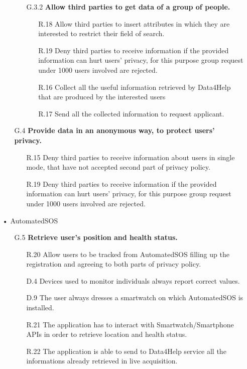 \begin{enumerate}
\begin{enumerate}
\begin{enumerate}
    	\item [G.3.2] \textbf{Allow third parties to get data of a group of people.}
		\begin{enumerate}
    	\item [R.18] Allow third parties to insert attributes in which they are interested to restrict their field of search.
    	\item [R.19] Deny third parties to receive information if the provided information can hurt users' privacy, for this purpose group request under 1000 users involved are rejected.
    	\item [R.16] Collect all the useful information retrieved by Data4Help that are produced by the interested users 
    	\item [R.17] Send all the collected information to request applicant.
    	\end{enumerate}
    	\end{enumerate}
    	
    \item [G.4] \textbf{Provide data in an anonymous way, to protect users' privacy.}
		\begin{enumerate}
    	\item [R.15] Deny third parties to receive information about users in  single mode, that have not accepted second part of privacy policy.
    	\item [R.19] Deny third parties to receive information if the provided information can hurt users' privacy, for this purpose group request under 1000 users involved are rejected.
    	\end{enumerate}	
			
	\end{enumerate}
	
	
\item[•]{\Large AutomatedSOS}
	
	\begin{enumerate}
	\item [G.5] \textbf{Retrieve user's position and health status.}
		\begin{enumerate}
		\item [R.20] Allow users to be tracked from AutomatedSOS filling up the registration and agreeing to both parts of privacy policy.
		\item [D.4] Devices used to monitor individuals always report correct values.
		\item [D.9] The user always dresses a smartwatch on which AutomatedSOS is installed.    
		\item [R.21] The application has to interact with Smartwatch/Smartphone APIs in order to retrieve location and health status.
		\item [R.22] The application is able to send to Data4Help service all the informations already retrieved in live acquisition.
		\end{enumerate}
		

\end{enumerate}
\end{enumerate}
